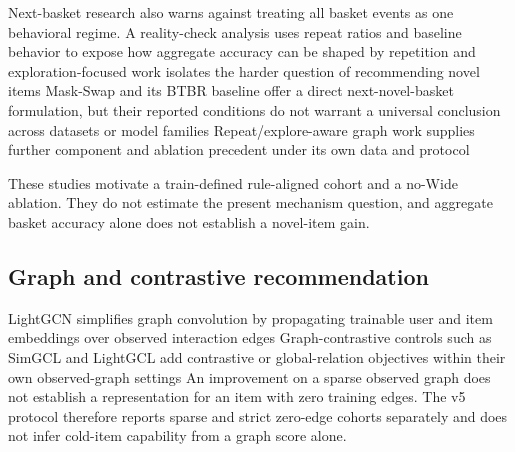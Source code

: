 Next-basket research also warns against treating all basket events as one
behavioral regime. A reality-check analysis uses repeat ratios and baseline
behavior to expose how aggregate accuracy can be shaped by repetition
\cite{li2023_nbr_reality} %
and exploration-focused work isolates the harder question of recommending novel
items
\cite{li2023_repetition_exploration} %
Mask-Swap and its BTBR baseline offer a direct next-novel-basket formulation,
but their reported conditions do not warrant a universal conclusion across
datasets or model families
\cite{li2023_mask_swap} %
Repeat/explore-aware graph work supplies further component and ablation
precedent under its own data and protocol
\cite{mansouri2026_repeat_explore_lightgcn} %

These studies motivate a train-defined rule-aligned cohort and a no-Wide
ablation. They do not estimate the present mechanism question, and aggregate
basket accuracy alone does not establish a novel-item gain.

\subsection{Graph and contrastive recommendation}

LightGCN simplifies graph convolution by propagating trainable user and item
embeddings over observed interaction edges
\cite{he2020_lightgcn} %
Graph-contrastive controls such as SimGCL and LightGCL add contrastive or
global-relation objectives within their own observed-graph settings
\cite{yu2022_simgcl} %
\cite{cai2023_lightgcl} %
An improvement on a sparse observed graph does not establish a representation
for an item with zero training edges. The v5 protocol therefore reports sparse
and strict zero-edge cohorts separately and does not infer cold-item capability
from a graph score alone.

